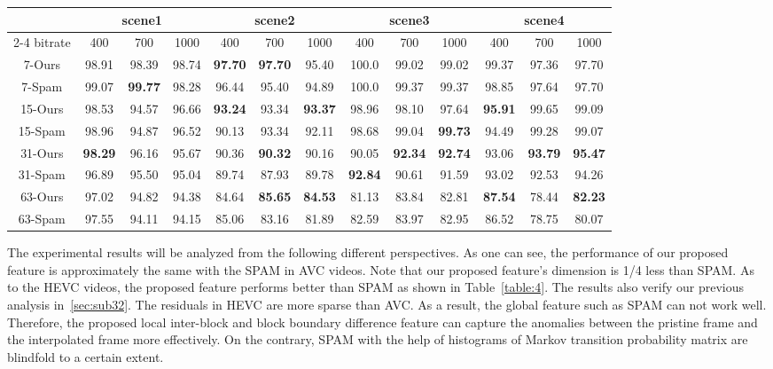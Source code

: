 \documentclass[pdftex,twocolumn,epjc3]{svjour3}          %
\begin{document}
\begin{table*}[b]
\renewcommand\arraystretch{1.5}
    \caption{Performance in H.265/HEVC videos(\%)}\label{table:4}
    \begin{center}
        \begin{tabular*}{14.5cm}{ccccccccccccc}
            \hline
            \ & \multicolumn{3}{c}{scene1} & \multicolumn{3}{c}{scene2} & \multicolumn{3}{c}{scene3} &\multicolumn{3}{c}{scene4} \\ \cline{2-4}\cline{5-7}\cline{8-10}\cline{11-13}
            bitrate & 400 & 700 & 1000 & 400 & 700 & 1000 & 400 & 700 & 1000 & 400 & 700 & 1000 \\ \hline
            7-Ours & 98.91 & 98.39 & 98.74 & \textbf{97.70} & \textbf{97.70} & 95.40 & 100.0 & 99.02 & 99.02 & 99.37 & 97.36 & 97.70 \\
            7-Spam & 99.07 & \textbf{99.77} & 98.28 & 96.44 & 95.40 & 94.89 & 100.0 & 99.37 & 99.37 & 98.85 & 97.64 & 97.70 \\ \hline
            15-Ours & 98.53 & 94.57 & 96.66 & \textbf{93.24} & 93.34 & \textbf{93.37} & 98.96 & 98.10 & 97.64 & \textbf{95.91} & 99.65 & 99.09 \\
            15-Spam & 98.96 & 94.87 & 96.52 & 90.13 & 93.34 & 92.11 & 98.68 & 99.04 & \textbf{99.73} & 94.49 & 99.28 & 99.07 \\ \hline
            31-Ours & \textbf{98.29} & 96.16 & 95.67 & 90.36 & \textbf{90.32} & 90.16 & 90.05 & \textbf{92.34} & \textbf{92.74} & 93.06 & \textbf{93.79} & \textbf{95.47} \\
            31-Spam & 96.89 & 95.50 & 95.04 & 89.74 & 87.93 & 89.78 & \textbf{92.84} & 90.61 & 91.59 & 93.02 & 92.53 & 94.26 \\ \hline
            63-Ours & 97.02 & 94.82 & 94.38 & 84.64 & \textbf{85.65} & \textbf{84.53} & 81.13 & 83.84 & 82.81 & \textbf{87.54} & 78.44 & \textbf{82.23} \\
            63-Spam & 97.55 & 94.11 & 94.15 & 85.06 & 83.16 & 81.89 & 82.59 & 83.97 & 82.95 & 86.52 & 78.75 & 80.07
            \\ \hline
        \end{tabular*}
    \end{center}
\end{table*}
The experimental results will be analyzed from the following different perspectives. As one can see, the performance of our proposed feature is approximately the same with the SPAM in AVC videos. Note that our proposed feature's dimension is 1/4 less than SPAM. As to the HEVC videos, the proposed feature performs better than SPAM as shown in Table~\ref{table:4}. The results also verify our previous analysis in~\ref{sec:sub32}. The residuals in HEVC are more sparse than AVC. As a result, the global feature such as SPAM can not work well. Therefore, the proposed local inter-block and block boundary difference feature can capture the anomalies between the pristine frame and the interpolated frame more effectively. On the contrary, SPAM with the help of histograms of Markov transition probability matrix are blindfold to a certain extent.
\end{document}
